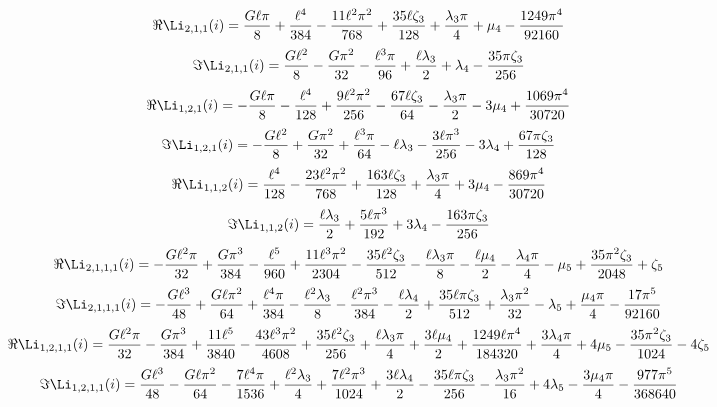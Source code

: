 \[
\Re\Li_{2,1,1}(i) = \frac{G \ell \pi}{8} + \frac{\ell^{4}}{384} - \frac{11 \ell^{2} \pi^{2}}{768} + \frac{35 \ell \zeta_{3}}{128} + \frac{\lambda_{3} \pi}{4} + \mu_{4} - \frac{1249 \pi^{4}}{92160}
\]
\[
\Im\Li_{2,1,1}(i) = \frac{G \ell^{2}}{8} - \frac{G \pi^{2}}{32} - \frac{\ell^{3} \pi}{96} + \frac{\ell \lambda_{3}}{2} + \lambda_{4} - \frac{35 \pi \zeta_{3}}{256}
\]
\[
\Re\Li_{1,2,1}(i) = - \frac{G \ell \pi}{8} - \frac{\ell^{4}}{128} + \frac{9 \ell^{2} \pi^{2}}{256} - \frac{67 \ell \zeta_{3}}{64} - \frac{\lambda_{3} \pi}{2} - 3 \mu_{4} + \frac{1069 \pi^{4}}{30720}
\]
\[
\Im\Li_{1,2,1}(i) = - \frac{G \ell^{2}}{8} + \frac{G \pi^{2}}{32} + \frac{\ell^{3} \pi}{64} - \ell \lambda_{3} - \frac{3 \ell \pi^{3}}{256} - 3 \lambda_{4} + \frac{67 \pi \zeta_{3}}{128}
\]
\[
\Re\Li_{1,1,2}(i) = \frac{\ell^{4}}{128} - \frac{23 \ell^{2} \pi^{2}}{768} + \frac{163 \ell \zeta_{3}}{128} + \frac{\lambda_{3} \pi}{4} + 3 \mu_{4} - \frac{869 \pi^{4}}{30720}
\]
\[
\Im\Li_{1,1,2}(i) = \frac{\ell \lambda_{3}}{2} + \frac{5 \ell \pi^{3}}{192} + 3 \lambda_{4} - \frac{163 \pi \zeta_{3}}{256}
\]
\[
\Re\Li_{2,1,1,1}(i) = - \frac{G \ell^{2} \pi}{32} + \frac{G \pi^{3}}{384} - \frac{\ell^{5}}{960} + \frac{11 \ell^{3} \pi^{2}}{2304} - \frac{35 \ell^{2} \zeta_{3}}{512} - \frac{\ell \lambda_{3} \pi}{8} - \frac{\ell \mu_{4}}{2} - \frac{\lambda_{4} \pi}{4} - \mu_{5} + \frac{35 \pi^{2} \zeta_{3}}{2048} + \zeta_{5}
\]
\[
\Im\Li_{2,1,1,1}(i) = - \frac{G \ell^{3}}{48} + \frac{G \ell \pi^{2}}{64} + \frac{\ell^{4} \pi}{384} - \frac{\ell^{2} \lambda_{3}}{8} - \frac{\ell^{2} \pi^{3}}{384} - \frac{\ell \lambda_{4}}{2} + \frac{35 \ell \pi \zeta_{3}}{512} + \frac{\lambda_{3} \pi^{2}}{32} - \lambda_{5} + \frac{\mu_{4} \pi}{4} - \frac{17 \pi^{5}}{92160}
\]
\[
\Re\Li_{1,2,1,1}(i) = \frac{G \ell^{2} \pi}{32} - \frac{G \pi^{3}}{384} + \frac{11 \ell^{5}}{3840} - \frac{43 \ell^{3} \pi^{2}}{4608} + \frac{35 \ell^{2} \zeta_{3}}{256} + \frac{\ell \lambda_{3} \pi}{4} + \frac{3 \ell \mu_{4}}{2} + \frac{1249 \ell \pi^{4}}{184320} + \frac{3 \lambda_{4} \pi}{4} + 4 \mu_{5} - \frac{35 \pi^{2} \zeta_{3}}{1024} - 4 \zeta_{5}
\]
\[
\Im\Li_{1,2,1,1}(i) = \frac{G \ell^{3}}{48} - \frac{G \ell \pi^{2}}{64} - \frac{7 \ell^{4} \pi}{1536} + \frac{\ell^{2} \lambda_{3}}{4} + \frac{7 \ell^{2} \pi^{3}}{1024} + \frac{3 \ell \lambda_{4}}{2} - \frac{35 \ell \pi \zeta_{3}}{256} - \frac{\lambda_{3} \pi^{2}}{16} + 4 \lambda_{5} - \frac{3 \mu_{4} \pi}{4} - \frac{977 \pi^{5}}{368640}
\]

